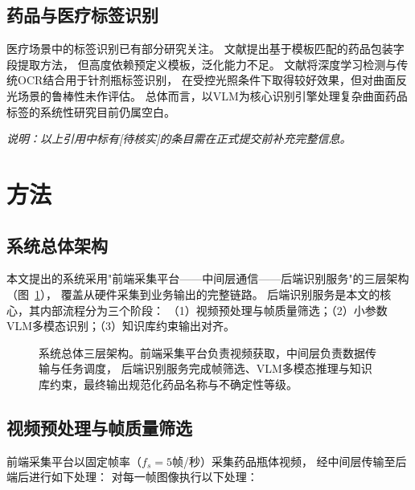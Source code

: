 \documentclass[12pt, a4paper]{article}
\begin{document}
\subsection{药品与医疗标签识别}

医疗场景中的标签识别已有部分研究关注。
文献\cite{ref:drug_label1}提出基于模板匹配的药品包装字段提取方法，
但高度依赖预定义模板，泛化能力不足。
文献\cite{ref:drug_label2}将深度学习检测与传统OCR结合用于针剂瓶标签识别，
在受控光照条件下取得较好效果，但对曲面反光场景的鲁棒性未作评估。
总体而言，以VLM为核心识别引擎处理复杂曲面药品标签的系统性研究目前仍属空白。

\textit{说明：以上引用中标有[待核实]的条目需在正式提交前补充完整信息。}


\section{方法}
\label{sec:method}

\subsection{系统总体架构}
\label{sec:method:overview}

本文提出的系统采用"前端采集平台——中间层通信——后端识别服务"的三层架构（图~\ref{fig:arch}），
覆盖从硬件采集到业务输出的完整链路。
后端识别服务是本文的核心，其内部流程分为三个阶段：
（1）视频预处理与帧质量筛选；（2）小参数VLM多模态识别；（3）知识库约束输出对齐。

\begin{figure}[htbp]
  \centering
  \caption{系统总体三层架构。前端采集平台负责视频获取，中间层负责数据传输与任务调度，
           后端识别服务完成帧筛选、VLM多模态推理与知识库约束，最终输出规范化药品名称与不确定性等级。}
  \label{fig:arch}
\end{figure}

\subsection{视频预处理与帧质量筛选}
\label{sec:method:preproc}

前端采集平台以固定帧率（$f_s = 5$帧/秒）采集药品瓶体视频，
经中间层传输至后端后进行如下处理：
对每一帧图像执行以下处理：
\end{document}
